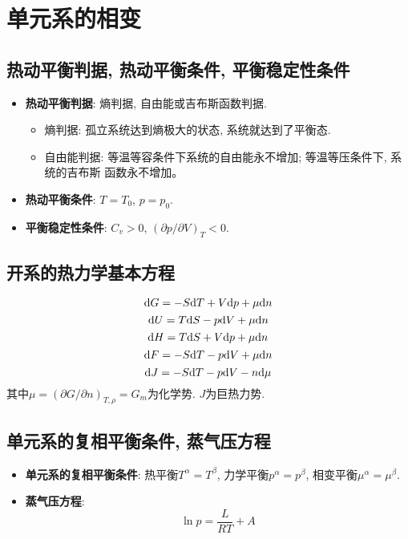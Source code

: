 \section{单元系的相变}

\subsection{热动平衡判据, 热动平衡条件, 平衡稳定性条件}
\begin{itemize}
\item \textbf{热动平衡判据}: 熵判据, 自由能或吉布斯函数判据.
      \begin{itemize}
      \item 熵判据: 孤立系统达到熵极大的状态, 系统就达到了平衡态. 
      \item 自由能判据: 等温等容条件下系统的自由能永不增加; 等温等压条件下, 系统的吉布斯
函数永不增加。
\end{itemize}
\item \textbf{热动平衡条件}: $T = T_0$, $p = p_0$.
\item \textbf{平衡稳定性条件}: $C_v >0$, $(\partial p/\partial V)_T<0$.
\end{itemize}


\subsection{开系的热力学基本方程}
\[
\mathrm{d} G = -S\mathrm{d} T + V\mathrm{d} p + \mu\mathrm{d} n
\]
\[
\mathrm{d} U = T\mathrm{d} S - p\mathrm{d} V + \mu\mathrm{d} n
\]
\[
\mathrm{d} H = T\mathrm{d} S + V\mathrm{d} p + \mu \mathrm{d} n
\]
\[
\mathrm{d} F = -S\mathrm{d} T - p\mathrm{d} V + \mu\mathrm{d} n
\]
\[
\mathrm{d} J = -S\mathrm{d} T -p\mathrm{d} V - n\mathrm{d} \mu
\]
其中$\mu=(\partial G/\partial n)_{T,\rho}=G_m$为化学势. $J$为巨热力势.


\subsection{单元系的复相平衡条件, 蒸气压方程}
\begin{itemize}
\item\textbf{单元系的复相平衡条件}: 热平衡$T^\alpha=T^\beta$,  力学平衡$p^\alpha=p^\beta$,  相变平衡$\mu^\alpha=\mu^\beta$.
\item\textbf{蒸气压方程}:
\[
\ln p = \frac{L}{RT} + A
\]
\end{itemize}

